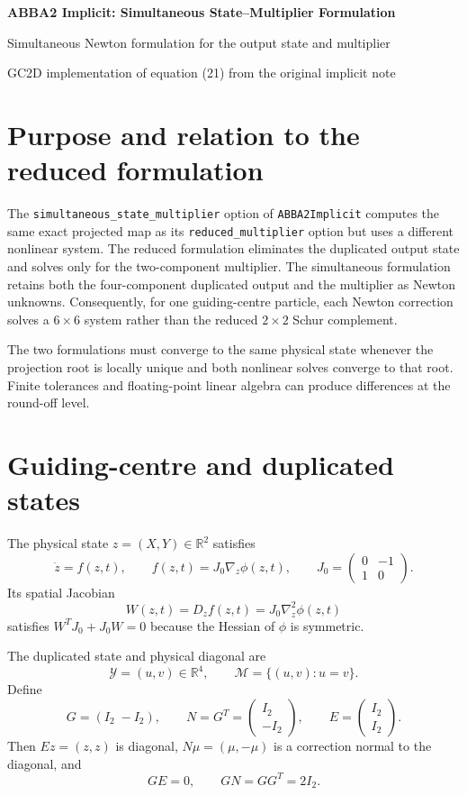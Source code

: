 \documentclass[11pt,a4paper]{article}
\newcommand{\R}{\mathbb{R}}
\newcommand{\Id}{I}
\newcommand{\Y}{\mathcal{Y}}
\newcommand{\M}{\mathcal{M}}
\begin{document}
\begin{center}
  {\LARGE\bfseries\color{blue}ABBA2 Implicit: Simultaneous State--Multiplier Formulation}\par
  \vspace{0.35em}
  {\large Simultaneous Newton formulation for the output state and multiplier}\par
  \vspace{0.45em}
  {\small GC2D implementation of equation (21) from the original implicit note}
\end{center}

\vspace{0.5em}

\section{Purpose and relation to the reduced formulation}

The \texttt{simultaneous\_state\_multiplier} option of
\texttt{ABBA2Implicit} computes the same exact projected map as its
\texttt{reduced\_multiplier} option but uses a different nonlinear system. The
reduced formulation eliminates the duplicated output state and solves only for
the two-component multiplier. The simultaneous formulation retains both the
four-component duplicated output and the multiplier as Newton
unknowns. Consequently, for one guiding-centre particle, each Newton correction
solves a $6\times6$ system rather than the reduced $2\times2$ Schur complement.

The two formulations must converge to the same physical state whenever the
projection root is locally unique and both nonlinear solves converge to that root.
Finite tolerances and floating-point linear algebra can produce differences at the
round-off level.

\section{Guiding-centre and duplicated states}

The physical state $z=(X,Y)\in\R^2$ satisfies
\[
 \dot z=f(z,t),
 \qquad
 f(z,t)=J_0\nabla_z\phi(z,t),
 \qquad
 J_0=
 \begin{pmatrix}
  0&-1\\
  1&0
 \end{pmatrix}.
\]
Its spatial Jacobian
\[
 W(z,t)=D_zf(z,t)=J_0\nabla_z^2\phi(z,t)
\]
satisfies $W^TJ_0+J_0W=0$ because the Hessian of $\phi$ is symmetric.

The duplicated state and physical diagonal are
\[
 \Y=(u,v)\in\R^4,
 \qquad
 \M=\{(u,v):u=v\}.
\]
Define
\[
 G=(\Id_2\;-\Id_2),
 \qquad
 N=G^T=
 \begin{pmatrix}\Id_2\\-\Id_2\end{pmatrix},
 \qquad
 E=
 \begin{pmatrix}\Id_2\\\Id_2\end{pmatrix}.
\]
Then $Ez=(z,z)$ is diagonal, $N\mu=(\mu,-\mu)$ is a correction
normal to the diagonal, and
\[
 GE=0,
 \qquad
 GN=GG^T=2\Id_2.
\]
\end{document}
